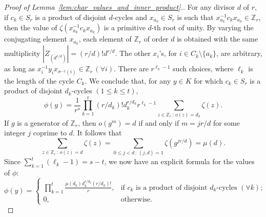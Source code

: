\documentclass[ALCO,published]{cedram}
\def\ZZ{{\mathbb Z}}
\begin{document}
\begin{proof}[Proof of  Lemma~\ref{lem:char_values_and_inner_product}.]
    For any divisor $d$ of $r$,
    if $c_k \in S_r$ is a product of disjoint $d$-cycles
    and $x_{a_k} \in S_r$ is such that $x_{a_k}^{-1}c_kx_{a_k} \in \ZZ_r$, 
    then the value of $\zeta(x_{a_k}^{-1}c_kx_{a_k})$ is a primitive $d$-th root of unity. By varying the conjugating element $x_{a_k}$, each element of $\ZZ_r$ of order $d$ is obtained with the same multiplicity $|Z_{(d^{r/d})}| = (r/d)! d^{r/d}$.  
    The other $x_i$'s, for $i \in C_k \setminus \{a_k\}$, are arbitrary, as long as $x_i^{-1}y_ix_{\sigma^{-1}(i)}\in \ZZ_r\,(\forall i)$. There are $r^{\ell_k - 1}$ such choices, where $\ell_k$ is the length of the cycle $C_k$.
    We conclude that, for any $y \in K$ for which $c_k \in S_r$ is a product of disjoint $d_k$-cycles $(1 \le k \le t)$,
    \[
        \phi(y) = \frac{1}{r^s} \prod_{k=1}^{t} 
        (r/d_k)! d_k^{r/d_k} r^{\ell_k - 1} 
        \sum_{z \in \ZZ_r \,:\, o(z) = d_k} \zeta(z).
    \]
    If $g$ is a generator of $\ZZ_r$, then $o(g^m) = d$ if and only if $m = jr/d$ for some integer $j$ coprime to $d$. 
    It follows that
    \[
        \sum_{z \in \ZZ_r \,:\, o(z) = d} \zeta(z) 
        = \sum_{0 \le j < d \,:\, (j,d) = 1} \zeta(g^{jr/d})
        = \mu(d).
    \]
    Since $\sum_{k=1}^{t} (\ell_k - 1) = s-t$,
    we now have an explicit formula for the values of $\phi$:
    \begin{equation}\label{eq:char_value}
	   \phi(y) =
	   \begin{cases}\displaystyle
	       \prod_{k=1}^{t} \frac{\mu(d_k) d_k^{r/d_k} (r/d_k)!}{r}, 
	       &\text{if } c_k \text{ is a product of disjoint } d_k \text{-cycles } (\forall k); \\
	       0, &\text{otherwise.}
	   \end{cases}
    \end{equation}


\end{proof}
\end{document}
